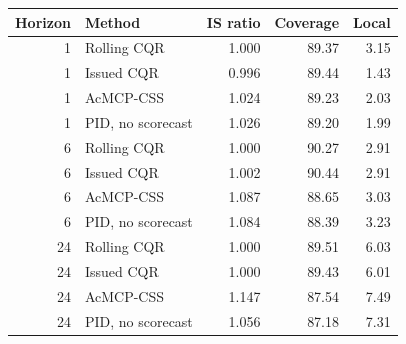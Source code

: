 \begin{tabular}{rlrrr}
\toprule
Horizon & Method & IS ratio & Coverage & Local \\
\midrule
1 & Rolling CQR & 1.000 & 89.37 & 3.15 \\
1 & Issued CQR & 0.996 & 89.44 & 1.43 \\
1 & AcMCP-CSS & 1.024 & 89.23 & 2.03 \\
1 & PID, no scorecast & 1.026 & 89.20 & 1.99 \\
6 & Rolling CQR & 1.000 & 90.27 & 2.91 \\
6 & Issued CQR & 1.002 & 90.44 & 2.91 \\
6 & AcMCP-CSS & 1.087 & 88.65 & 3.03 \\
6 & PID, no scorecast & 1.084 & 88.39 & 3.23 \\
24 & Rolling CQR & 1.000 & 89.51 & 6.03 \\
24 & Issued CQR & 1.000 & 89.43 & 6.01 \\
24 & AcMCP-CSS & 1.147 & 87.54 & 7.49 \\
24 & PID, no scorecast & 1.056 & 87.18 & 7.31 \\
\bottomrule
\end{tabular}
